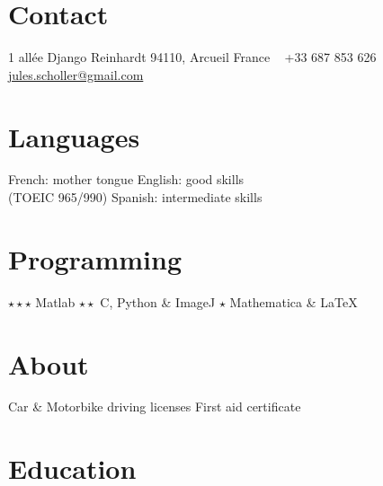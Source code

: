 \documentclass[]{friggeri-cv} %
\begin{document}


\begin{aside} %
\section{Contact}
1 allée Django Reinhardt
94110, Arcueil
France
~
+33 687 853 626
~
\href{mailto:jules.scholler@gmail.com}{jules.scholler@gmail.com}
\section{Languages}
French: mother tongue
English: good skills \\ (TOEIC 965/990)
Spanish: intermediate skills
\section{Programming}
{\color{red} $\star\star\star$} Matlab
{\color{red} $\star\star$} C, Python \& ImageJ
{\color{red} $\star$} Mathematica \& \LaTeX
\section{About}
Car \& Motorbike driving licenses
First aid certificate
\end{aside}


\section{Education}
\end{document}
